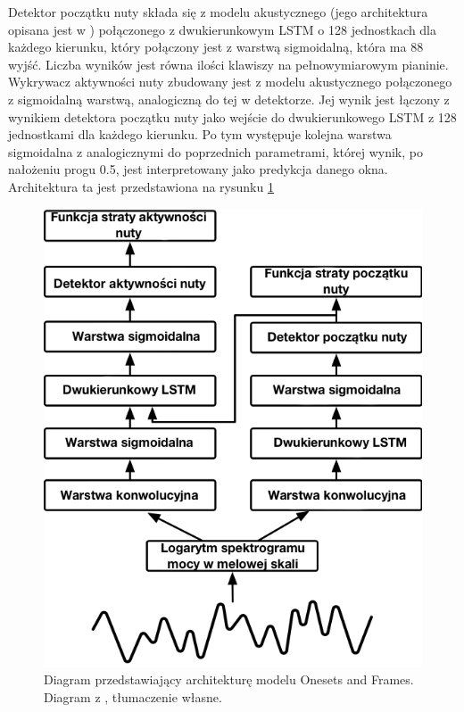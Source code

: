 \documentclass[12pt,a4paper,twoside]{mwart}
\begin{document}
Detektor początku nuty składa się z modelu akustycznego (jego architektura opisana jest w 
\cite[1-3]{Transcription:Kelz:AcousticModel})
połączonego z dwukierunkowym LSTM o 128 jednostkach dla każdego kierunku, który połączony jest z warstwą sigmoidalną, która ma 88 wyjść. Liczba wyników jest równa ilości klawiszy na pełnowymiarowym pianinie. Wykrywacz aktywności nuty zbudowany jest z modelu akustycznego połączonego z sigmoidalną warstwą, analogiczną do tej w detektorze. Jej wynik jest łączony z wynikiem detektora początku nuty jako wejście do dwukierunkowego LSTM z 128 jednostkami dla każdego kierunku. Po tym występuje kolejna warstwa sigmoidalna z analogicznymi do poprzednich parametrami, której wynik, po nałożeniu progu 0.5, jest interpretowany jako predykcja danego okna. Architektura ta jest przedstawiona na rysunku \ref{fig:onsetsAndFramesArch}
\begin{figure}[h]
  \begin{center}
    \includegraphics[scale=0.8]{images/architekturaSieciOnesetsFrames.png}
    \caption{Diagram przedstawiający architekturę modelu Onesets and Frames. Diagram z \cite{Transcription:OnsetsAndFrames:Blog}, tłumaczenie własne.}
    \label{fig:onsetsAndFramesArch}
  \end{center}
\end{figure}
\end{document}
